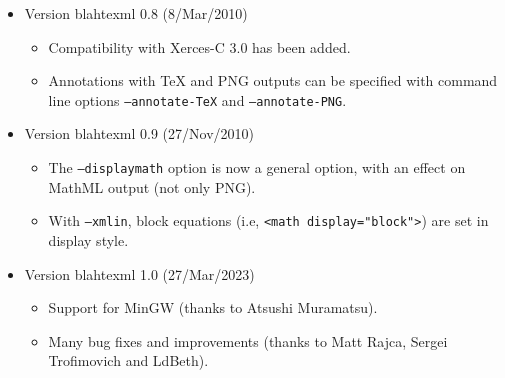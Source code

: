 \documentclass{article}
\begin{document}
\begin{itemize}
\begin{itemize}
\end{itemize}
\item Version blahtexml 0.8 (8/Mar/2010)
\begin{itemize}
\item Compatibility with Xerces-C 3.0 has been added.
\item Annotations with TeX and PNG outputs can be specified with command line options \texttt{--annotate-TeX} and \texttt{--annotate-PNG}.
\end{itemize}
\item Version blahtexml 0.9 (27/Nov/2010)
\begin{itemize}
\item The \texttt{--displaymath} option is now a general option, with an effect on MathML output (not only PNG).
\item With \texttt{--xmlin}, block equations (i.e, \texttt{<math display="block">}) are set in display style.
\end{itemize}
\item Version blahtexml 1.0 (27/Mar/2023)
\begin{itemize}
\item Support for MinGW (thanks to Atsushi Muramatsu).
\item Many bug fixes and improvements (thanks to Matt Rajca, Sergei Trofimovich and LdBeth).
\end{itemize}
\end{itemize}
\end{document}
